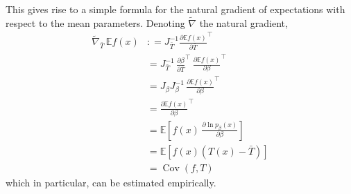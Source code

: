 \documentclass[11pt,a4paper]{article}
\newcommand{\deq}{\mathrel{\mathop{:}}=}
\DeclareMathOperator{\Cov}{Cov}
\newcommand{\E}{\mathbb{E}}
\newcommand{\1}{\mathbbm{1}}
\theoremstyle{yannthm}
\theoremstyle{yannthm2}
\newcommand{\transp}[1]{#1^{\!\top}\!}
\numberwithin{equation}{section}
\begin{document}
{This gives rise to a simple formula for the natural gradient of
expectations with respect to the mean parameters. Denoting $\tilde
\nabla$ the natural gradient,
\begin{align}
\tilde\nabla_{\bar T}\, \E f(x) &\deq J_{\bar T}^{-1} \transp{\frac{\partial \E
f(x)}{\partial \bar T}}
\\&= J_{\bar T}^{-1} \,\transp{\frac{\partial \beta}{\partial \bar T}} \,\transp{\frac{\partial \E
f(x)}{\partial \beta}}
\\&=J_{\beta} J_\beta^{-1} \,\transp{\frac{\partial \E
f(x)}{\partial \beta}}
\\&=\transp{\frac{\partial \E
f(x)}{\partial \beta}}
\\&=\E\left[f(x) \,\frac{\partial \ln p_\beta(x)}{\partial \beta}
\right]
\\&=\E\left[f(x) (T(x)-\bar T)
\right]
\\&=\Cov(f,T)
\end{align}
which in particular, can be estimated empirically.
}



\end{document}
